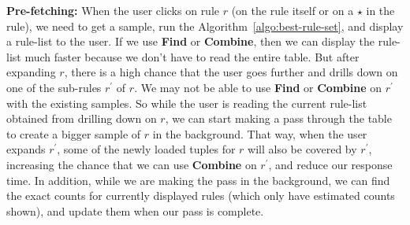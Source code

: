 \smallskip
\noindent \textbf{Pre-fetching:} When the user clicks on rule $r$ (on the rule itself or on a $\star$ in the rule), we need to get a sample, run the Algorithm~\ref{algo:best-rule-set}, and display a rule-list to the user. If we use \textbf{Find} or \textbf{Combine}, then we can display the rule-list much faster because we don't have to read the entire table. But after expanding $r$, there is a high chance that the user goes further and drills down on one of the sub-rules $r^{\prime}$ of $r$. We may not be able to use \textbf{Find} or \textbf{Combine} on $r^{\prime}$ with the existing samples. So while the user is reading the current rule-list obtained from drilling down on $r$, we can start making a pass through the table to create a bigger sample of $r$ in the background. That way, when the user expands $r^{\prime}$, some of the newly loaded tuples for $r$ will also be covered by $r^{\prime}$, increasing the chance that we can use \textbf{Combine} on $r^{\prime}$, and reduce our response time.
In addition, while we are making the pass in the background, we can find the exact counts for currently displayed rules (which only have estimated counts shown), and update them when our pass is complete.

